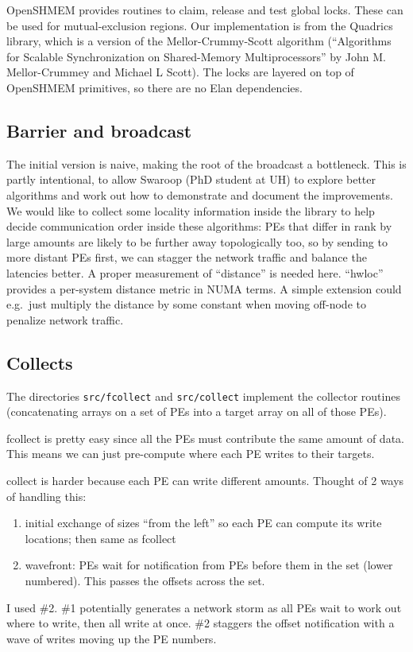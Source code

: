 \documentclass[english]{article}
\begin{document}
OpenSHMEM provides routines to claim, release and test global locks.
These can be used for mutual-exclusion regions. Our implementation is
from the Quadrics library, which is a version of the
Mellor-Crummy-Scott algorithm (``Algorithms for Scalable
Synchronization on Shared-Memory Multiprocessors'' by John
M. Mellor-Crummey and Michael L Scott).  The locks are layered on top
of OpenSHMEM primitives, so there are no Elan dependencies.

\subsection{Barrier and broadcast}

The initial version is naive, making the root of the broadcast a
bottleneck.  This is partly intentional, to allow Swaroop (PhD student
at UH) to explore better algorithms and work out how to demonstrate
and document the improvements. We would like to collect some locality
information inside the library to help decide communication order
inside these algorithms: PEs that differ in rank by large amounts are
likely to be further away topologically too, so by sending to more
distant PEs first, we can stagger the network traffic and balance the
latencies better. A proper measurement of ``distance'' is needed
here. ``hwloc'' provides a per-system distance metric in NUMA
terms. A simple extension could e.g.\ just multiply the distance
by some constant when moving off-node to penalize network traffic.

\subsection{Collects}

The directories \texttt{src/fcollect} and \texttt{src/collect}
implement the collector routines (concatenating arrays on a set of PEs
into a target array on all of those PEs).

fcollect is pretty easy since all the PEs must contribute the same
amount of data. This means we can just pre-compute where each PE
writes to their targets.

collect is harder because each PE can write different amounts. Thought
of 2 ways of handling this:
\begin{enumerate}
\item initial exchange of sizes ``from the left'' so each PE can
compute its write locations; then same as fcollect
\item wavefront: PEs wait for notification from PEs before them in the
set (lower numbered). This passes the offsets across the set.
\end{enumerate}
I used \#2. \#1 potentially generates a network storm as all PEs wait
to work out where to write, then all write at once. \#2 staggers the
offset notification with a wave of writes moving up the PE numbers.
\end{document}
